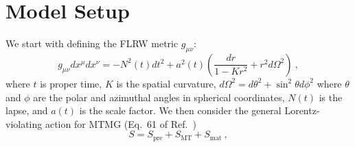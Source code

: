 \documentclass[prd,twocolumn,aps,psfig,nofootinbib,nobibnotes,superscriptaddress,preprintnumbers,times]{revtex4-2}
\begin{document}
\section{Model Setup}\label{sec:setup}
We start with defining the FLRW metric $g_{\mu\nu}$:
\begin{equation}\label{eqn:metric}
    g_{\mu\nu}dx^{\mu} dx^{\nu} = -N^2(t)dt^2 +a^2(t)\left(\frac{dr}{1-Kr^2} + r^2 d\Omega^2\right)\ ,
\end{equation}
where $t$ is proper time, $K$ is the spatial curvature, $d\Omega^2 = d\theta^2 + \sin^2\theta d\phi^2$ where $\theta$ and $\phi$ are the polar and azimuthal angles in spherical coordinates, $N(t)$ is the lapse, and $a(t)$ is the scale factor. We then consider the general Lorentz-violating action for MTMG (Eq.\ 61 of Ref.\ \cite{DeFelice:2015moy})
\begin{equation}\label{eqn:action}
    S = S_{\text{pre}} + S_{\text{MT}} + S_{\text{mat}}\ ,
\end{equation}
\end{document}
